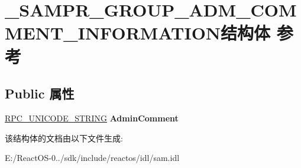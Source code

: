\hypertarget{struct___s_a_m_p_r___g_r_o_u_p___a_d_m___c_o_m_m_e_n_t___i_n_f_o_r_m_a_t_i_o_n}{}\section{\+\_\+\+S\+A\+M\+P\+R\+\_\+\+G\+R\+O\+U\+P\+\_\+\+A\+D\+M\+\_\+\+C\+O\+M\+M\+E\+N\+T\+\_\+\+I\+N\+F\+O\+R\+M\+A\+T\+I\+O\+N结构体 参考}
\label{struct___s_a_m_p_r___g_r_o_u_p___a_d_m___c_o_m_m_e_n_t___i_n_f_o_r_m_a_t_i_o_n}
\subsection*{Public 属性}
\begin{DoxyCompactItemize}
\item 
\mbox{\label{struct___s_a_m_p_r___g_r_o_u_p___a_d_m___c_o_m_m_e_n_t___i_n_f_o_r_m_a_t_i_o_n_a72dcaf51b4a8d6f0e692f2a4e18fe489}} 
\hyperlink{struct___r_p_c___u_n_i_c_o_d_e___s_t_r_i_n_g}{R\+P\+C\+\_\+\+U\+N\+I\+C\+O\+D\+E\+\_\+\+S\+T\+R\+I\+NG} {\bfseries Admin\+Comment}
\end{DoxyCompactItemize}


该结构体的文档由以下文件生成\+:\begin{DoxyCompactItemize}
\item 
E\+:/\+React\+O\+S-\/0../sdk/include/reactos/idl/sam.\+idl\end{DoxyCompactItemize}
